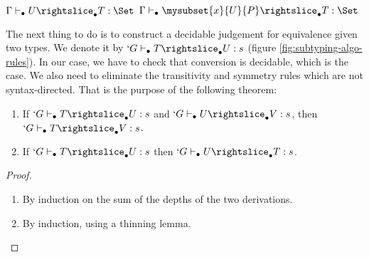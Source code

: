 \documentclass{llncs}
\renewcommand{\SubSubAs}[1][\Gamma]{%
\UAX{SubSub}
{$\subalgoimpl{#1}{c}{U}{T}{\Set}$}
{$\subalgoimpl{#1}{c[\eltpit~\ctxdot]}{\mysubset{x}{U}{P}}{T}{\Set}$}
{}
}
\begin{document}
\begin{paragraph}{}

\begin{figure*}
    \def\fCenter{\suba}
    \def\type{\typea}
    \def\sub{\suba}
    \begin{center}
    \SubConvA\DP 

    \vspace{\infvspace}
    \SubHnfA\DP

    \vspace{\infvspace}
    \SubProdA\DP

    \vspace{\infvspace}
    \SubSigmaA\DP

    \vspace{\infvspace}
    \SubProofA\DP

    \vspace{\infvspace}
    \SubSubAs\DP
  \end{center}
  \vspace{-2em}
  \caption{\Russell{} algorithmic equivalence}
  \label{fig:subtyping-algo-rules}
  \vspace{-1em}
\end{figure*}


\end{paragraph}
\begin{paragraph}{}
  The next thing to do is to construct a decidable judgement for
  equivalence given two types. We denote it by $`G \typea T
  \suba U : s$ (figure \ref{fig:subtyping-algo-rules}).
  In our case, we have to check that conversion is decidable, which is the
  case. We also need to eliminate the transitivity and symmetry rules which are not
  syntax-directed. That is the purpose of the following theorem:
\begin{theorem}
  \begin{enumerate}
  \item If $`G \typea T \suba U : s$ and $`G \typea U \suba V : s$, then $`G \typea T
    \suba V : s$.
  \item If $`G \typea T \suba U : s$ then $`G \typea U \suba T : s$.
  \end{enumerate}
\end{theorem}
\begin{proof}
  \begin{enumerate}
  \item By induction on the sum of the depths of the two derivations.
  \item By induction, using a thinning lemma.
  \end{enumerate}
\end{proof}
\end{paragraph}
\end{document}
